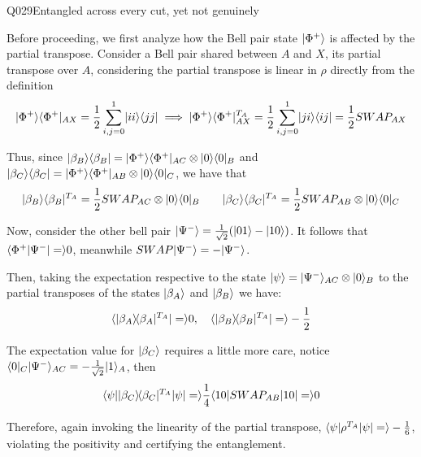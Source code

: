 \begin{entry}{Q029}{Entangled across every cut, yet not genuinely}
\begin{solution}[a]
Before proceeding, we first analyze how the Bell pair state $\lvert \Phi^+ \rangle$ is affected by the partial transpose. Consider a Bell pair shared between $ A$ and $ X$, its partial transpose over $A$, considering the partial transpose is linear in $\rho$ directly from the definition
\begin{equation}
    \lvert \Phi^+ \rangle \langle \Phi^+ \rvert_{AX}=\frac{1}{2} \sum_{i,j=0}^{1} \lvert ii \rangle \langle jj \rvert \implies
    \lvert \Phi^+ \rangle \langle \Phi^+ \rvert_{AX}^{T_A}=\frac{1}{2} \sum_{i,j=0}^{1} \lvert ji \rangle \langle ij \rvert = \frac{1}{2}SWAP_{AX}
\end{equation}


Thus, since $\lvert \beta_B \rangle \langle \beta_B \rvert= \lvert \Phi^+ \rangle \langle \Phi^+ \rvert_{AC} \otimes \lvert 0 \rangle \langle 0 \rvert_{B}$ and $\lvert \beta_C \rangle \langle \beta_C \rvert= \lvert \Phi^+ \rangle \langle \Phi^+ \rvert_{AB} \otimes \lvert 0 \rangle \langle 0 \rvert_{C}$, we have that 
\begin{equation}
    \lvert \beta_B \rangle \langle \beta_B \rvert^{T_A} = \frac{1}{2}SWAP_{AC} \otimes \lvert 0 \rangle \langle 0 \rvert_{B} \qquad \lvert \beta_C \rangle \langle \beta_C \rvert^{T_A} = \frac{1}{2}SWAP_{AB} \otimes \lvert 0 \rangle \langle 0 \rvert_{C}
\end{equation}

Now, consider the other bell pair $\lvert \Psi^- \rangle = \frac{1}{\sqrt{2}} (\lvert 01 \rangle-\lvert 10 \rangle)$. It follows that $\langle \Phi^+|\Psi^- \vert = \rangle0$, meanwhile $SWAP\lvert \Psi^- \rangle = - \lvert \Psi^- \rangle$.

Then, taking the expectation respective to the state  $\lvert \psi \rangle=\lvert \Psi^- \rangle_{AC}\otimes \lvert 0 \rangle_B$ to the partial transposes of the states $\lvert \beta_A \rangle$ and $\lvert \beta_B \rangle$ we have:
\begin{equation}
    \langle \lvert \beta_A \rangle\!\langle \beta_A \rvert^{T_A} \vert = \rangle 0, \quad \langle \lvert \beta_B \rangle\!\langle \beta_B \rvert^{T_A} \vert = \rangle -\frac{1}{2} 
\end{equation}

The expectation value for $\lvert \beta_C \rangle$ requires a little more care, notice $\langle 0 \rvert_C \lvert \Psi^- \rangle_{AC} =  -\frac{1}{\sqrt{2}}\lvert 1 \rangle_A$, then
\begin{equation}
    \langle \psi|\lvert \beta_C \rangle\!\langle \beta_C \rvert^{T_A}|\psi \vert = \rangle \frac{1}{4}\langle 10|SWAP_{AB}|10 \vert = \rangle0
\end{equation}

Therefore, again invoking the linearity of the partial transpose, $\langle \psi|\rho^{T_A}|\psi \vert = \rangle -\frac{1}{6}$, violating the positivity and certifying the entanglement.


\end{solution}

\begin{solution}[b)]


\end{solution}
\end{entry}
